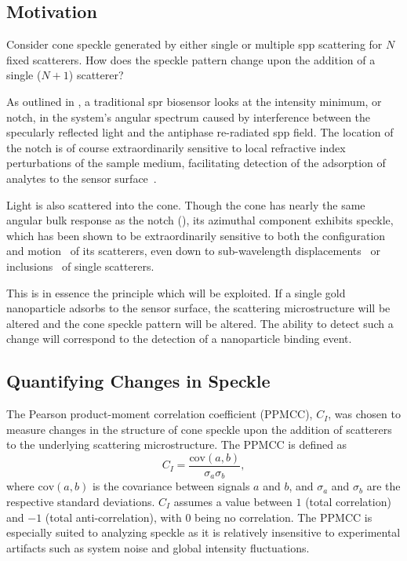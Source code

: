 \subsection{Motivation}
Consider cone speckle generated by either single or multiple \gls{spp} scattering
for $N$ fixed scatterers.  How does the speckle pattern change upon the
addition of a single ($N+1$) scatterer?

As outlined in , a traditional \gls{spr} biosensor looks at
the intensity minimum, or notch, in the system's angular spectrum caused by
interference between the specularly reflected light and the antiphase
re-radiated \gls{spp} field.  The location of the notch is of course
extraordinarily sensitive to local refractive index perturbations of the
sample medium, facilitating detection of the adsorption of analytes to the
sensor surface~\cite{homola1999surface}.

Light is also scattered into the cone.  Though the cone has nearly the same
angular bulk response as the notch (), its azimuthal
component exhibits speckle, which has been shown to be extraordinarily
sensitive to both the configuration and motion~\cite{berkovits1994correlations}
of its scatterers, even down to sub-wavelength
displacements~\cite{berkovits1991sensitivity} or
inclusions~\cite{berkovits1990theory} of single scatterers.

This is in essence the principle which will be exploited.  If a single gold
nanoparticle adsorbs to the sensor surface, the scattering microstructure will
be altered and the cone speckle pattern will be altered.  The ability to
detect such a change will correspond to the detection of a nanoparticle
binding event.

\subsection{Quantifying Changes in Speckle}
The Pearson product-moment correlation coefficient (PPMCC), $C_I$, was chosen
to measure changes in the structure of cone speckle upon the addition of
scatterers to the underlying scattering microstructure.  The PPMCC is defined
as
\begin{equation}
  C_I = \frac{\mathrm{cov}(a,b)}{\sigma_a \sigma_b},
  \label{eqn:pearsonproductmoment}
\end{equation}
where $\mathrm{cov}(a,b)$ is the covariance between signals $a$ and $b$,
and $\sigma_a$ and $\sigma_b$ are the respective standard deviations.  $C_I$
assumes a value between $1$ (total correlation) and $-1$ (total
anti-correlation), with $0$ being no correlation.
The PPMCC is especially suited to analyzing speckle as it is relatively
insensitive to experimental artifacts such as system noise and global
intensity fluctuations.

